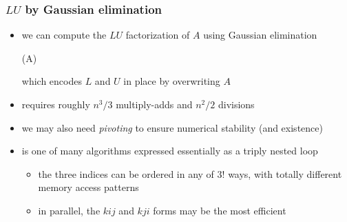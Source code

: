 \begin{frame}[fragile]
%
  \frametitle{$LU$ by Gaussian elimination}
%
  \begin{itemize}
%
  \item we can compute the $LU$ factorization of $A$ using Gaussian elimination
    \begin{center}
      \begin{minipage}{.85\linewidth}
        \begin{algorithm}[H]
          \label{alg:LU-gaussian}
%
          \DontPrintSemicolon
          \SetAlCapHSkip{0ex}
%
          \caption{\lu(A)}
%
%
        \end{algorithm}
      \end{minipage}
    \end{center}
%
    which encodes $L$ and $U$ in place by overwriting $A$
%
  \item {} requires roughly $n^{3}/3$ multiply-adds and $n^{2}/2$ divisions
%
  \item we may also need {\em pivoting} to ensure numerical stability (and existence)
%
  \item {} is one of many algorithms expressed essentially as a triply nested loop
    \begin{itemize}
    \item the three indices can be ordered in any of $3!$ ways, with totally different memory
      access patterns
    \item in parallel, the $kij$ and $kji$ forms may be the most efficient
    \end{itemize}
%
  \end{itemize}
%
\end{frame}
%

